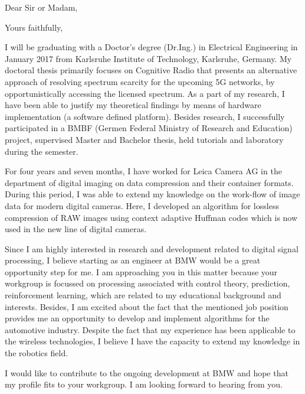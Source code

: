 \documentclass[11pt,a4paper,sans]{moderncv}        %
\begin{document}
\date{\today}
\opening{Dear Sir or Madam,}
\closing{Yours faithfully,}
\makelettertitle
I will be graduating with a Doctor's degree (Dr.Ing.) in Electrical Engineering in January 2017 from Karlsruhe Institute of Technology, Karlsruhe, Germany. My doctoral thesis primarily focuses on Cognitive Radio that presents an alternative approach of resolving spectrum scarcity for the upcoming 5G networks, by opportunistically accessing the licensed spectrum. As a part of my research, I have been able to justify my theoretical findings by means of hardware implementation (a software defined platform). Besides research, I successfully participated in a BMBF (Germen Federal Ministry of Research and Education) project, supervised Master and Bachelor thesis, held tutorials and laboratory during the semester. 

For four years and seven months, I have worked for Leica Camera AG in the department of digital imaging on data compression and their container formats. During this period, I was able to extend my knowledge on the work-flow of image data for modern digital cameras. Here, I developed an algorithm for lossless compression of RAW images using context adaptive Huffman codes which is now used in the new line of digital cameras.

Since I am highly interested in research and development related to digital signal processing, I believe starting as an engineer at BMW would be a great opportunity step for me. I am approaching you in this matter because your workgroup is focussed on processing associated with control theory, prediction, reinforcement learning, which are related to my educational background and interests. Besides, I am excited about the fact that the mentioned job position provides me an opportunity to develop and implement algorithms for the automotive industry. Despite the fact that my experience has been applicable to the wireless technologies, I believe I have the capacity to extend my knowledge in the robotics field.

I would like to contribute to the ongoing development at BMW and hope that my profile fits to your workgroup. I am looking forward to hearing from you. 


\makeletterclosing
\end{document}
